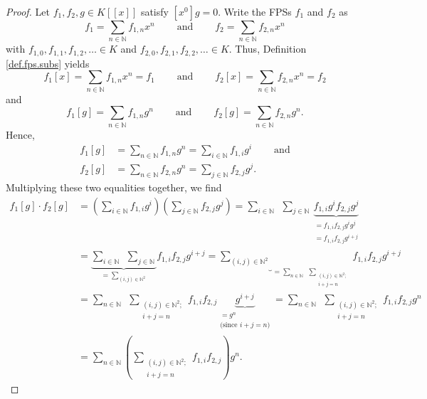 \begin{proof}
Let $f_{1},f_{2},g\in K\left[  \left[  x\right]  \right]  $ satisfy $\left[
x^{0}\right]  g=0$. Write the FPSs $f_{1}$ and $f_{2}$ as
\begin{equation}
f_{1}=\sum_{n\in\mathbb{N}}f_{1,n}x^{n}\ \ \ \ \ \ \ \ \ \ \text{and}%
\ \ \ \ \ \ \ \ \ \ f_{2}=\sum_{n\in\mathbb{N}}f_{2,n}x^{n}
\label{pf.prop.fps.subs.rules.b.1}%
\end{equation}
with $f_{1,0},f_{1,1},f_{1,2},\ldots\in K$ and $f_{2,0},f_{2,1},f_{2,2}%
,\ldots\in K$. Thus, Definition \ref{def.fps.subs} yields%
\[
f_{1}\left[  x\right]  =\sum_{n\in\mathbb{N}}f_{1,n}x^{n}=f_{1}%
\ \ \ \ \ \ \ \ \ \ \text{and}\ \ \ \ \ \ \ \ \ \ f_{2}\left[  x\right]
=\sum_{n\in\mathbb{N}}f_{2,n}x^{n}=f_{2}%
\]
and
\[
f_{1}\left[  g\right]  =\sum_{n\in\mathbb{N}}f_{1,n}g^{n}%
\ \ \ \ \ \ \ \ \ \ \text{and}\ \ \ \ \ \ \ \ \ \ f_{2}\left[  g\right]
=\sum_{n\in\mathbb{N}}f_{2,n}g^{n}.
\]
Hence,%
\begin{align*}
f_{1}\left[  g\right]   &  =\sum_{n\in\mathbb{N}}f_{1,n}g^{n}=\sum
_{i\in\mathbb{N}}f_{1,i}g^{i}\ \ \ \ \ \ \ \ \ \ \text{and}\\
f_{2}\left[  g\right]   &  =\sum_{n\in\mathbb{N}}f_{2,n}g^{n}=\sum
_{j\in\mathbb{N}}f_{2,j}g^{j}.
\end{align*}
Multiplying these two equalities together, we find%
\begin{align}
f_{1}\left[  g\right]  \cdot f_{2}\left[  g\right]   &  =\left(  \sum
_{i\in\mathbb{N}}f_{1,i}g^{i}\right)  \left(  \sum_{j\in\mathbb{N}}%
f_{2,j}g^{j}\right)  =\sum_{i\in\mathbb{N}}\ \ \sum_{j\in\mathbb{N}%
}\underbrace{f_{1,i}g^{i}f_{2,j}g^{j}}_{\substack{=f_{1,i}f_{2,j}g^{i}%
g^{j}\\=f_{1,i}f_{2,j}g^{i+j}}}\nonumber\\
&  =\underbrace{\sum_{i\in\mathbb{N}}\ \ \sum_{j\in\mathbb{N}}}_{=\sum
_{\left(  i,j\right)  \in\mathbb{N}^{2}}}f_{1,i}f_{2,j}g^{i+j}%
=\underbrace{\sum_{\left(  i,j\right)  \in\mathbb{N}^{2}}}_{=\sum
_{n\in\mathbb{N}}\ \ \sum_{\substack{\left(  i,j\right)  \in\mathbb{N}%
^{2};\\i+j=n}}}f_{1,i}f_{2,j}g^{i+j}\nonumber\\
&  =\sum_{n\in\mathbb{N}}\ \ \sum_{\substack{\left(  i,j\right)  \in
\mathbb{N}^{2};\\i+j=n}}f_{1,i}f_{2,j}\underbrace{g^{i+j}}_{\substack{=g^{n}%
\\\text{(since }i+j=n\text{)}}}=\sum_{n\in\mathbb{N}}\ \ \sum
_{\substack{\left(  i,j\right)  \in\mathbb{N}^{2};\\i+j=n}}f_{1,i}f_{2,j}%
g^{n}\nonumber\\
&  =\sum_{n\in\mathbb{N}}\left(  \sum_{\substack{\left(  i,j\right)
\in\mathbb{N}^{2};\\i+j=n}}f_{1,i}f_{2,j}\right)  g^{n}.
\label{pf.prop.fps.subs.rules.b.3}%
\end{align}



\end{proof}
